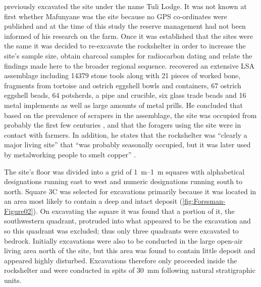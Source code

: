 \documentclass{ijsra}
\begin{document}
	\textcite{Walker_1994} previously excavated the site under the name Tuli Lodge. It was not known at first whether Mafunyane was the \textcite{Walker_1994} site because no GPS co-ordinates were published and at the time of this study the reserve management had not been informed of his research on the farm. Once it was established that the sites were the same it was decided to re-excavate the rockshelter in order to increase the site’s sample size, obtain charcoal samples for radiocarbon dating and relate the findings made here to the broader regional sequence. \textcite{Walker_1994} recovered an extensive LSA assemblage including \num{14379} stone tools along with 21 pieces of worked bone, fragments from tortoise and ostrich eggshell bowls and containers, 67 ostrich eggshell beads, 64 potsherds, a pipe and crucible, six glass trade beads and 16 metal implements as well as large amounts of metal prills. 
	He concluded that based on the prevalence of scrapers in the assemblage, the site was occupied from probably the first few centuries \AD, and that the foragers using the site were in contact with farmers. 
In addition, he states that the rockshelter was \enquote{clearly a major living site} that 
	\enquote{was probably seasonally occupied, but it was later used by metalworking people to smelt copper} \parencite[10]{Walker_1994}. 
	
The site’s floor was  divided into a grid of \SIrange{1}{1}{\meter} squares with alphabetical designations running east to west and numeric designations running south to north. 
Square 3C was selected for excavations primarily because it was located in an area most likely to contain a deep and intact deposit (\cref{fig:Forssman-Figure02}). 
On excavating the square it was found that a portion of it, the southwestern quadrant, protruded into what appeared to be the \textcite{Walker_1994} excavation and so this quadrant was excluded; 
thus only three quadrants were excavated to bedrock. Initially excavations were also to be conducted in the large open-air living area north of the site, but this area was found to contain little deposit and appeared highly disturbed. 
Excavations therefore only proceeded inside the rockshelter and were conducted in spits of \SI{30}{\milli\meter} following natural stratigraphic units.
\end{document}
